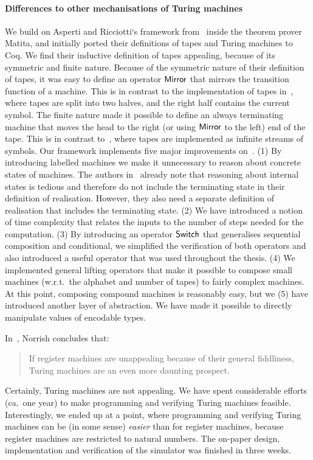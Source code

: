 \paragraph{Differences to other mechanisations of Turing machines}
We build on Asperti and Ricciotti`s framework from~\cite{asperti2015} inside the theorem prover Matita, and initially ported their definitions of
tapes and Turing machines to Coq.  We find their inductive definition of tapes appealing, because of its symmetric and finite nature.  Because of the
symmetric nature of their definition of tapes, it was easy to define an operator $\mathsf{Mirror}$ that mirrors the transition function of a machine.
This is in contrast to the implementation of tapes in~\cite{xu2013}, where tapes are split into two halves, and the right half contains the current
symbol.  The finite nature made it possible to define an always terminating machine that moves the head to the right (or using $\mathsf{Mirror}$ to the
left) end of the tape.  This is in contrast to~\cite{ciaffaglione2016}, where tapes are implemented as infinite streams of symbols.  Our framework
implements five major improvements on~\cite{asperti2015}.  (1) By introducing labelled machines we make it unnecessary to reason about concrete states
of machines.  The authors in~\cite{asperti2015} already note that reasoning about internal states is tedious and therefore do not include the
terminating state in their definition of realisation.  However, they also need a separate definition of realisation that includes the terminating
state.  (2) We have introduced a notion of time complexity that relates the inputs to the number of steps needed for the computation.  (3) By
introducing an operator $\mathsf{Switch}$ that generalises sequential composition and conditional, we simplified the verification of both operators and also
introduced a useful operator that was used throughout the thesis.  (4) We implemented general lifting operators that make it possible to compose small
machines (w.r.t.\ the alphabet and number of tapes) to fairly complex machines.  At this point, composing compound machines is reasonably easy, but we
(5) have introduced another layer of abstraction.  We have made it possible to directly manipulate values of encodable types.

In~\cite{norrish2011mechanised}, Norrish concludes that:
\begin{quote}
  If register machines are unappealing because of their general fiddliness, Turing machines are an even more daunting prospect.
\end{quote}
Certainly, Turing machines are not appealing.  We have spent considerable efforts (ca.\ one year) to make programming and verifying Turing machines
feasible.  Interestingly, we ended up at a point, where programming and verifying Turing machines can be (in some sense) \textit{easier} than for
register machines, because register machines are restricted to natural numbers.  The on-paper design, implementation and verification of the simulator
was finished in three weeks.


